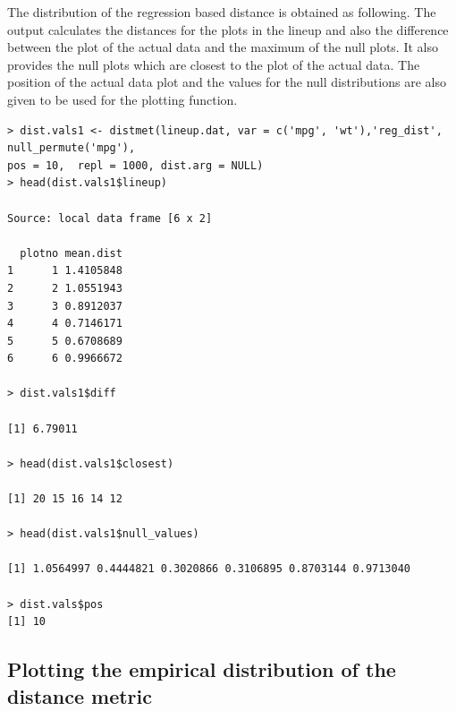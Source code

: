 \documentclass[article]{jss}
\begin{document}
The distribution of the regression based distance is obtained as following. The output calculates the distances for the plots in the lineup and also the difference between the plot of the actual data and the maximum of the null plots. It also provides the null plots which are closest to the plot of the actual data. The position of the actual data plot and the values for the null distributions are also given to be used for the plotting function. 

\begin{verbatim}
> dist.vals1 <- distmet(lineup.dat, var = c('mpg', 'wt'),'reg_dist', null_permute('mpg'), 
pos = 10,  repl = 1000, dist.arg = NULL)
> head(dist.vals1$lineup)

Source: local data frame [6 x 2]

  plotno mean.dist
1      1 1.4105848
2      2 1.0551943
3      3 0.8912037
4      4 0.7146171
5      5 0.6708689
6      6 0.9966672

> dist.vals1$diff

[1] 6.79011

> head(dist.vals1$closest)

[1] 20 15 16 14 12

> head(dist.vals1$null_values)

[1] 1.0564997 0.4444821 0.3020866 0.3106895 0.8703144 0.9713040

> dist.vals$pos
[1] 10

\end{verbatim}


\subsection{Plotting the empirical distribution of the distance
metric}\label{plotting-the-empirical-distribution-of-the-distance-metric}
\end{document}
